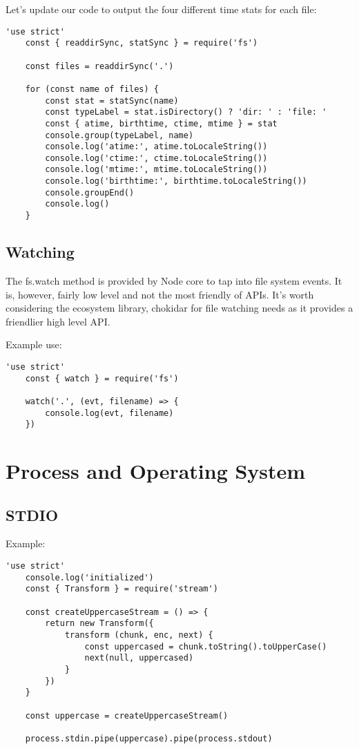 \documentclass{scrartcl}
\begin{document}
Let's update our code to output the four different time stats for each file:

\begin{lstlisting}[style=ES6]
    'use strict'
    const { readdirSync, statSync } = require('fs')

    const files = readdirSync('.')

    for (const name of files) {
        const stat = statSync(name)
        const typeLabel = stat.isDirectory() ? 'dir: ' : 'file: '
        const { atime, birthtime, ctime, mtime } = stat
        console.group(typeLabel, name)
        console.log('atime:', atime.toLocaleString())
        console.log('ctime:', ctime.toLocaleString())
        console.log('mtime:', mtime.toLocaleString())
        console.log('birthtime:', birthtime.toLocaleString())
        console.groupEnd()
        console.log()
    }
\end{lstlisting}

\subsection{Watching}

The fs.watch method is provided by Node core to tap into file system events. It is, however, fairly low level and not the most friendly of APIs. It's worth considering the ecosystem library, chokidar for file watching needs as it provides a friendlier high level API.

Example use:

\begin{lstlisting}[style=ES6]
    'use strict'
    const { watch } = require('fs')

    watch('.', (evt, filename) => {
        console.log(evt, filename)
    })
\end{lstlisting}

\section{Process and Operating System}

\subsection{STDIO}

Example:

\begin{lstlisting}[style=ES6]
    'use strict'
    console.log('initialized')
    const { Transform } = require('stream')

    const createUppercaseStream = () => {
        return new Transform({
            transform (chunk, enc, next) {
                const uppercased = chunk.toString().toUpperCase()
                next(null, uppercased)
            }
        })
    }

    const uppercase = createUppercaseStream()

    process.stdin.pipe(uppercase).pipe(process.stdout)
\end{lstlisting}
\end{document}
